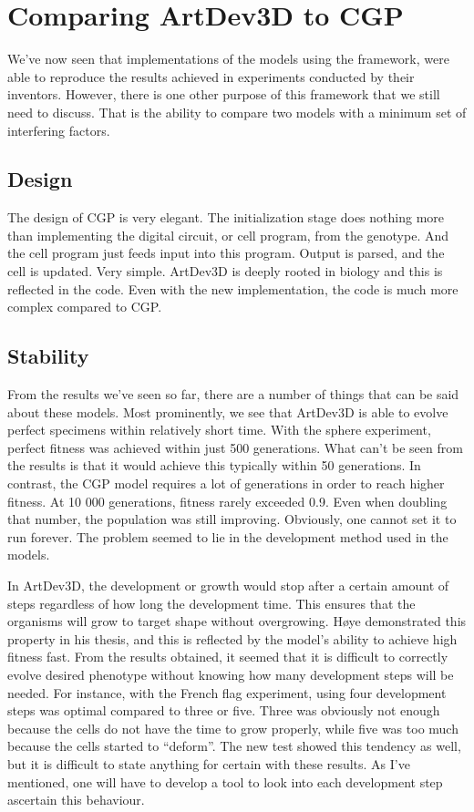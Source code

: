 \section{Comparing ArtDev3D to CGP}
We've now seen that implementations of the models using the framework, were able to reproduce the results achieved in experiments conducted by their inventors. However, there is one other purpose of this framework that we still need to discuss. That is the ability to compare two models with a minimum set of interfering factors.

\subsection{Design}
The design of CGP is very elegant. The initialization stage does nothing more than implementing the digital circuit, or cell program, from the genotype. And the cell program just feeds input into this program. Output is parsed, and the cell is updated. Very simple. ArtDev3D is deeply rooted in biology and this is reflected in the code. Even with the new implementation, the code is much more complex compared to CGP.

\subsection{Stability}
From the results we've seen so far, there are a number of things that can be said about these models. Most prominently, we see that ArtDev3D is able to evolve perfect specimens within relatively short time. With the sphere experiment, perfect fitness was achieved within just 500 generations. What can't be seen from the results is that it would achieve this typically within 50 generations. In contrast, the CGP model requires a lot of generations in order to reach higher fitness. At 10 000 generations, fitness rarely exceeded 0.9. Even when doubling that number, the population was still improving. Obviously, one cannot set it to run forever. The problem seemed to lie in the development method used in the models.

In ArtDev3D, the development or growth would stop after a certain amount of steps regardless of how long the development time. This ensures that the organisms will grow to target shape without overgrowing. H{\o}ye\cite{hoye2006} demonstrated this property in his thesis, and this is reflected by the model's ability to achieve high fitness fast. From the results obtained, it seemed that it is difficult to correctly evolve desired phenotype without knowing how many development steps will be needed. For instance, with the French flag experiment, using four development steps was optimal compared to three or five. Three was obviously not enough because the cells do not have the time to grow properly, while five was too much because the cells started to ``deform''. The new test showed this tendency as well, but it is difficult to state anything for certain with these results. As I've mentioned, one will have to develop a tool to look into each development step ascertain this behaviour.
